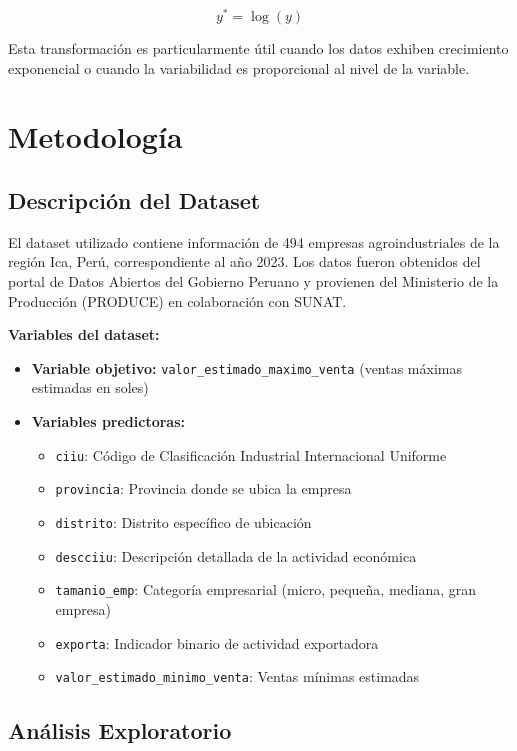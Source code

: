 \documentclass[12pt,a4paper]{article}
\begin{document}
\begin{equation}
y^* = \log(y)
\end{equation}

Esta transformación es particularmente útil cuando los datos exhiben crecimiento exponencial o cuando la variabilidad es proporcional al nivel de la variable.

\section{Metodología}

\subsection{Descripción del Dataset}

El dataset utilizado contiene información de 494 empresas agroindustriales de la región Ica, Perú, correspondiente al año 2023. Los datos fueron obtenidos del portal de Datos Abiertos del Gobierno Peruano y provienen del Ministerio de la Producción (PRODUCE) en colaboración con SUNAT.

\textbf{Variables del dataset:}
\begin{itemize}
    \item \textbf{Variable objetivo:} \texttt{valor\_estimado\_maximo\_venta} (ventas máximas estimadas en soles)
    \item \textbf{Variables predictoras:}
    \begin{itemize}
        \item \texttt{ciiu}: Código de Clasificación Industrial Internacional Uniforme
        \item \texttt{provincia}: Provincia donde se ubica la empresa
        \item \texttt{distrito}: Distrito específico de ubicación
        \item \texttt{descciiu}: Descripción detallada de la actividad económica
        \item \texttt{tamanio\_emp}: Categoría empresarial (micro, pequeña, mediana, gran empresa)
        \item \texttt{exporta}: Indicador binario de actividad exportadora
        \item \texttt{valor\_estimado\_minimo\_venta}: Ventas mínimas estimadas
    \end{itemize}
\end{itemize}

\subsection{Análisis Exploratorio}
\end{document}
